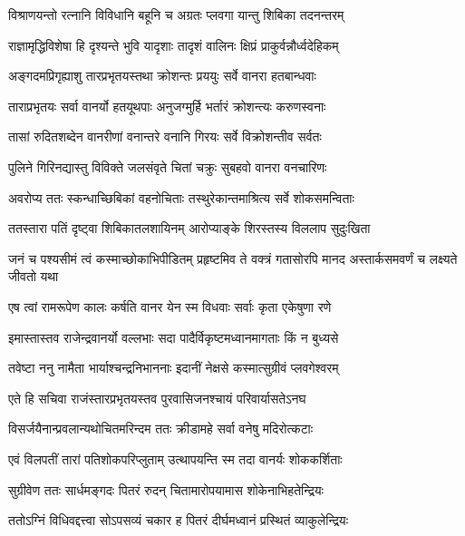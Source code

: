 \twolineshloka
{विश्राणयन्तो रत्नानि विविधानि बहूनि च}
{अग्रतः प्लवगा यान्तु शिबिका तदनन्तरम्} %

\twolineshloka
{राज्ञामृद्धिविशेषा हि दृश्यन्ते भुवि यादृशाः}
{तादृशं वालिनः क्षिप्रं प्राकुर्वन्नौर्ध्वदेहिकम्} %

\twolineshloka
{अङ्गदमप्रिगृह्याशु तारप्रभृतयस्तथा}
{क्रोशन्तः प्रययुः सर्वे वानरा हतबान्धवाः} %

\twolineshloka
{ताराप्रभृतयः सर्वा वानर्यो हतयूथपाः}
{अनुजग्मुर्हि भर्तारं क्रोशन्त्यः करुणस्वनाः} %

\twolineshloka
{तासां रुदितशब्देन वानरीणां वनान्तरे}
{वनानि गिरयः सर्वे विक्रोशन्तीव सर्वतः} %

\twolineshloka
{पुलिने गिरिनद्यास्तु विविक्ते जलसंवृते}
{चितां चक्रुः सुबहवो वानरा वनचारिणः} %

\twolineshloka
{अवरोप्य ततः स्कन्धाच्छिबिकां वहनोचिताः}
{तस्थुरेकान्तमाश्रित्य सर्वे शोकसमन्विताः} %

\twolineshloka
{ततस्तारा पतिं दृष्ट्वा शिबिकातलशायिनम्}
{आरोप्याङ्के शिरस्तस्य विललाप सुदुःखिता} %

\threelineshloka
{जनं च पश्यसीमं त्वं कस्माच्छोकाभिपीडितम्}
{प्रहृष्टमिव ते वक्त्रं गतासोरपि मानद}
{अस्तार्कसमवर्णं च लक्ष्यते जीवतो यथा} %

\twolineshloka
{एष त्वां रामरूपेण कालः कर्षति वानर}
{येन स्म विधवाः सर्वाः कृता एकेषुणा रणे} %

\twolineshloka
{इमास्तास्तव राजेन्द्रवानर्यो वल्लभाः सदा}
{पादैर्विकृष्टमध्वानमागताः किं न बुध्यसे} %

\twolineshloka
{तवेष्टा ननु नामैता भार्याश्चन्द्रनिभाननाः}
{इदानीं नेक्षसे कस्मात्सुग्रीवं प्लवगेश्वरम्} %

\twolineshloka
{एते हि सचिवा राजंस्तारप्रभृतयस्तव}
{पुरवासिजनश्चायं परिवार्यासतेऽनघ} %

\twolineshloka
{विसर्जयैनान्प्रवलान्यथोचितमरिन्दम}
{ततः क्रीडामहे सर्वा वनेषु मदिरोत्कटाः} %

\twolineshloka
{एवं विलपतीं तारां पतिशोकपरिप्लुताम्}
{उत्थापयन्ति स्म तदा वानर्यः शोककर्शिताः} %

\twolineshloka
{सुग्रीवेण ततः सार्धमङ्गदः पितरं रुदन्}
{चितामारोपयामास शोकेनाभिहतेन्द्रियः} %

\twolineshloka
{ततोऽग्निं विधिवद्दत्त्वा सोऽपसव्यं चकार ह}
{पितरं दीर्घमध्वानं प्रस्थितं व्याकुलेन्द्रियः} %

